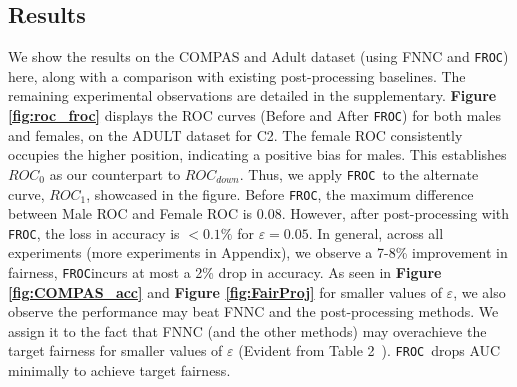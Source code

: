 \documentclass{article}
\newcommand{\av}[1]{ \textcolor{blue}{{\bf AV: }{``\em #1''}}}
\newcommand{\ouralgo}{\texttt{FROC}}
\begin{document}
\subsection{Results}
We show the results on the COMPAS and Adult dataset (using FNNC and \ouralgo) here, along with a comparison with existing post-processing baselines.
The remaining experimental observations are detailed in the supplementary.
%
\textbf{Figure \ref{fig:roc_froc}} displays the ROC curves (Before and After \ouralgo) for both males and females, on the ADULT dataset for C2. The female ROC consistently occupies the higher position, indicating a positive bias for males. This establishes $ROC_{0}$ as our counterpart to $ROC_{down}$. Thus, we apply \ouralgo\ to the alternate curve, $ROC_{1}$, showcased in the figure. Before \ouralgo, the maximum difference between Male ROC and Female ROC is $0.08$. However, after post-processing with \ouralgo, the loss in accuracy is $<0.1\%$ for $\varepsilon=0.05$. 
In general, across all experiments (more experiments in Appendix), we observe a 7-8\% improvement in fairness, \ouralgo incurs at most a 2\% drop in accuracy. As seen in \textbf{Figure \ref{fig:COMPAS_acc}} and \textbf{Figure \ref{fig:FairProj}} for smaller values of $\varepsilon$, we also observe the performance may beat FNNC and the post-processing methods.
We assign it to the fact that FNNC (and the other methods) may overachieve the target fairness for smaller values of $\varepsilon$ (Evident from Table 2~\cite{padala21}). \ouralgo\ drops AUC minimally to achieve target fairness. 

        
\end{document}
